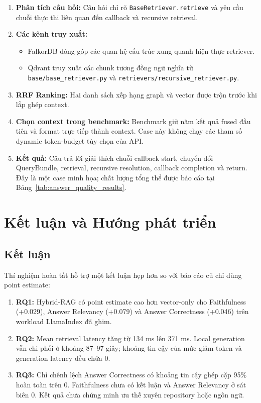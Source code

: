 \documentclass[12pt,a4paper,oneside]{report}
\begin{document}
\begin{enumerate}
    \item \textbf{Phân tích câu hỏi:} Câu hỏi chỉ rõ \texttt{BaseRetriever.retrieve} và yêu cầu chuỗi thực thi liên quan đến callback và recursive retrieval.
    \item \textbf{Các kênh truy xuất:}
    \begin{itemize}
        \item FalkorDB đóng góp các quan hệ cấu trúc xung quanh hiện thực retriever.
        \item Qdrant truy xuất các chunk tương đồng ngữ nghĩa từ \texttt{base/base\_retriever.py} và \texttt{retrievers/recursive\_retriever.py}.
    \end{itemize}
    \item \textbf{RRF Ranking:} Hai danh sách xếp hạng graph và vector được trộn trước khi lắp ghép context.
    \item \textbf{Chọn context trong benchmark:} Benchmark giữ năm kết quả fused đầu tiên và format trực tiếp thành context. Case này không chạy các tham số dynamic token-budget tùy chọn của API.
    \item \textbf{Kết quả:} Câu trả lời giải thích chuỗi callback start, chuyển đổi QueryBundle, retrieval, recursive resolution, callback completion và return. Đây là một case minh họa; chất lượng tổng thể được báo cáo tại Bảng~\ref{tab:answer_quality_results}.
\end{enumerate}

\newpage

\chapter{Kết luận và Hướng phát triển}

\section{Kết luận}
Thí nghiệm hoàn tất hỗ trợ một kết luận hẹp hơn so với báo cáo cũ chỉ dùng point estimate:
\begin{enumerate}
    \item \textbf{RQ1:} Hybrid-RAG có point estimate cao hơn vector-only cho Faithfulness (+0.029), Answer Relevancy (+0.079) và Answer Correctness (+0.046) trên workload LlamaIndex đã ghim.
    \item \textbf{RQ2:} Mean retrieval latency tăng từ 134 ms lên 371 ms. Local generation vẫn chi phối ở khoảng 87--97 giây; khoảng tin cậy của mức giảm token và generation latency đều chứa 0.
    \item \textbf{RQ3:} Chỉ chênh lệch Answer Correctness có khoảng tin cậy ghép cặp 95\% hoàn toàn trên 0. Faithfulness chưa có kết luận và Answer Relevancy ở sát biên 0. Kết quả chưa chứng minh ưu thế xuyên repository hoặc ngôn ngữ.
\end{enumerate}
\end{document}
